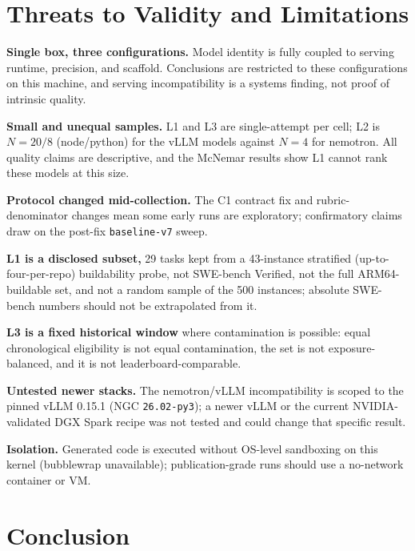 \documentclass[10pt,twocolumn]{article}
\newcommand{\code}[1]{\texttt{\small #1}}
\begin{document}
\section{Threats to Validity and Limitations}

\textbf{Single box, three configurations.} Model identity is fully coupled to serving runtime,
precision, and scaffold. Conclusions are restricted to these configurations on this machine, and
serving incompatibility is a systems finding, not proof of intrinsic quality.

\textbf{Small and unequal samples.} L1 and L3 are single-attempt per cell; L2 is $N=20/8$
(node/python) for the vLLM models against $N=4$ for nemotron. All quality claims are descriptive,
and the McNemar results show L1 cannot rank these models at this size.

\textbf{Protocol changed mid-collection.} The C1 contract fix and rubric-denominator changes mean
some early runs are exploratory; confirmatory claims draw on the post-fix \code{baseline-v7}
sweep.

\textbf{L1 is a disclosed subset,} 29 tasks kept from a 43-instance stratified (up-to-four-per-repo)
buildability probe, not SWE-bench Verified, not the full ARM64-buildable set, and not a random
sample of the 500 instances; absolute SWE-bench numbers should not be extrapolated from it.

\textbf{L3 is a fixed historical window} where contamination is possible: equal chronological
eligibility is not equal contamination, the set is not exposure-balanced, and it is not
leaderboard-comparable.

\textbf{Untested newer stacks.} The nemotron/vLLM incompatibility is scoped to the pinned vLLM
0.15.1 (NGC \code{26.02-py3}); a newer vLLM or the current NVIDIA-validated DGX Spark recipe was
not tested and could change that specific result.

\textbf{Isolation.} Generated code is executed without OS-level sandboxing on this kernel
(bubblewrap unavailable); publication-grade runs should use a no-network container or VM.

\section{Conclusion}
\end{document}
